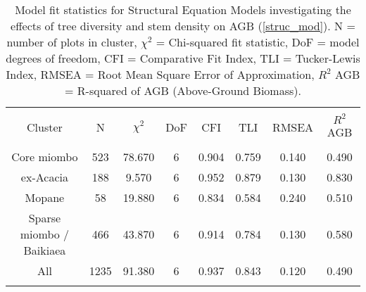 
\begin{table}[!htbp] \centering 
  	\caption{Model fit statistics for Structural Equation Models investigating the effects of tree diversity and stem density on AGB (\autoref{struc_mod}). N = number of plots in cluster, $\chi^{2}$ = Chi-squared fit statistic, DoF = model degrees of freedom, CFI = Comparative Fit Index, TLI = Tucker-Lewis Index, RMSEA = Root Mean Square Error of Approximation, $R^{2}$ AGB = R-squared of AGB (Above-Ground Biomass).} 
  \label{struc_model_fit_clust_stats} 
\begin{tabular}{@{\extracolsep{0pt}} cccccccc} 
\\[-1.8ex]\hline 
\hline \\[-1.8ex] 
{Cluster} & {N} & {$\chi^{2}$} & {DoF} & {CFI} & {TLI} & {RMSEA} & {$R^{2}$ AGB} \\
\hline \\[-1.8ex] 
Core miombo & 523 & 78.670 & 6 & 0.904 & 0.759 & 0.140 & 0.490 \\ 
ex-Acacia & 188 & 9.570 & 6 & 0.952 & 0.879 & 0.130 & 0.830 \\ 
Mopane & 58 & 19.880 & 6 & 0.834 & 0.584 & 0.240 & 0.510 \\ 
Sparse miombo / Baikiaea & 466 & 43.870 & 6 & 0.914 & 0.784 & 0.130 & 0.580 \\ 
All & 1235 & 91.380 & 6 & 0.937 & 0.843 & 0.120 & 0.490 \\ 
\hline \\[-1.8ex] 
\end{tabular} 
\end{table} 
